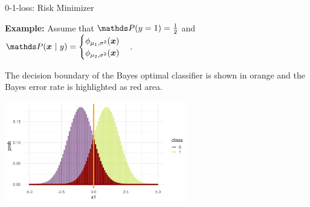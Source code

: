\begin{vbframe}{0-1-loss: Risk Minimizer}
\framebreak 

\textbf{Example: } Assume that $\P(y = 1) = \frac{1}{2}$ and $
\P(\xv ~|~ y) = \begin{cases}\phi_{\mu_1, \sigma^2}(\xv) \\ \phi_{\mu_2, \sigma^2}(\xv)\end{cases}$.

\lz


The decision boundary of the Bayes optimal classifier is shown in orange and the Bayes error rate is highlighted as red area. 

\begin{center}
\includegraphics[width = 8cm ]{figure_man/bayes_error_5.png} \\
\end{center}

% 
% 

\end{vbframe}

